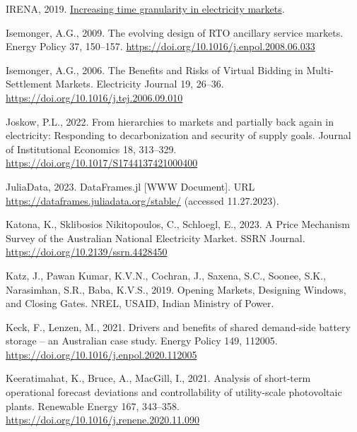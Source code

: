 \documentclass[12pt,a4paper,]{report}
\newlength{\cslhangindent}
\newenvironment{CSLReferences}[2] %
 {%
  \setlength{\parindent}{0pt}
  \ifodd #1 \everypar{\setlength{\hangindent}{\cslhangindent}}\ignorespaces\fi
  \ifnum #2 > 0
  \setlength{\parskip}{#2\baselineskip}
  \fi
 }%
 {}
\begin{document}
\begin{CSLReferences}{1}{0}
\leavevmode{}%
IRENA, 2019. \href{https://www.irena.org}{Increasing time granularity in
electricity markets}.

\leavevmode{}%
Isemonger, A.G., 2009. The evolving design of {RTO} ancillary service
markets. Energy Policy 37, 150--157.
\url{https://doi.org/10.1016/j.enpol.2008.06.033}

\leavevmode{}%
Isemonger, A.G., 2006. The {Benefits} and {Risks} of {Virtual Bidding}
in {Multi-Settlement Markets}. Electricity Journal 19, 26--36.
\url{https://doi.org/10.1016/j.tej.2006.09.010}

\leavevmode{}%
Joskow, P.L., 2022. From hierarchies to markets and partially back again
in electricity: Responding to decarbonization and security of supply
goals. Journal of Institutional Economics 18, 313--329.
\url{https://doi.org/10.1017/S1744137421000400}

\leavevmode{}%
JuliaData, 2023. {DataFrames}.jl {[}WWW Document{]}. URL
\url{https://dataframes.juliadata.org/stable/} (accessed 11.27.2023).

\leavevmode{}%
Katona, K., Sklibosios Nikitopoulos, C., Schloegl, E., 2023. A {Price
Mechanism Survey} of the {Australian National Electricity Market}. SSRN
Journal. \url{https://doi.org/10.2139/ssrn.4428450}

\leavevmode{}%
Katz, J., Pawan Kumar, K.V.N., Cochran, J., Saxena, S.C., Soonee, S.K.,
Narasimhan, S.R., Baba, K.V.S., 2019. Opening {Markets}, {Designing
Windows}, and {Closing Gates}. NREL, USAID, Indian Ministry of Power.

\leavevmode{}%
Keck, F., Lenzen, M., 2021. Drivers and benefits of shared demand-side
battery storage -- an {Australian} case study. Energy Policy 149,
112005. \url{https://doi.org/10.1016/j.enpol.2020.112005}

\leavevmode{}%
Keeratimahat, K., Bruce, A., MacGill, I., 2021. Analysis of short-term
operational forecast deviations and controllability of utility-scale
photovoltaic plants. Renewable Energy 167, 343--358.
\url{https://doi.org/10.1016/j.renene.2020.11.090}


\end{CSLReferences}
\end{document}
